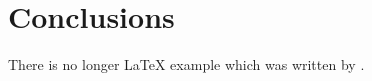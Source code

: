 \section{Conclusions}\label{conclusions}
There is no longer \LaTeX{} example which was written by \cite{doe}.